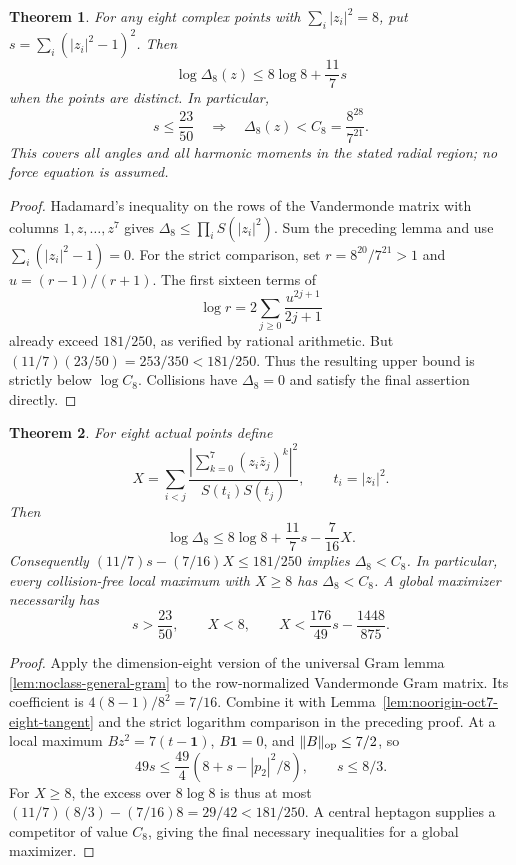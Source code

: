 \documentclass[11pt]{article}
\newtheorem{theorem}{Theorem}[section]
\theoremstyle{remark}
\numberwithin{equation}{section}
\begin{document}
\begin{theorem}\label{thm:noorigin-oct7-eight-lowvariance}
For any eight complex points with $\sum_i|z_i|^2=8$, put
$s=\sum_i(|z_i|^2-1)^2$. Then
\[
 \log\Delta_8(z)\le8\log8+\frac{11}{7}s
\]
when the points are distinct. In particular,
\[
 s\le\frac{23}{50}\quad\Longrightarrow\quad
 \Delta_8(z)<C_8=\frac{8^{28}}{7^{21}}.
\]
This covers all angles and all harmonic moments in the stated radial
region; no force equation is assumed.
\end{theorem}
\begin{proof}
Hadamard's inequality on the rows of the Vandermonde matrix with
columns $1,z,\ldots,z^7$ gives $\Delta_8\le\prod_iS(|z_i|^2)$.
Sum the preceding lemma and use $\sum_i(|z_i|^2-1)=0$.
For the strict comparison, set $r=8^{20}/7^{21}>1$ and
$u=(r-1)/(r+1)$. The first sixteen terms of
\[
 \log r=2\sum_{j\ge0}\frac{u^{2j+1}}{2j+1}
\]
already exceed $181/250$, as verified by rational arithmetic.
But $(11/7)(23/50)=253/350<181/250$.
Thus the resulting upper bound is strictly below $\log C_8$.
Collisions have $\Delta_8=0$ and satisfy the final assertion directly.
\end{proof}

\begin{theorem}\label{thm:noorigin-oct7-eight-correlation}
For eight actual points define
\[
 X=\sum_{i<j}\frac{|\sum_{k=0}^7(z_i\overline z_j)^k|^2}
 {S(t_i)S(t_j)},\qquad t_i=|z_i|^2.
\]
Then
\[
 \log\Delta_8\le8\log8+\frac{11}{7}s-\frac7{16}X.
\]
Consequently $(11/7)s-(7/16)X\le181/250$ implies
$\Delta_8<C_8$. In particular, every collision-free local maximum
with $X\ge8$ has $\Delta_8<C_8$. A global maximizer necessarily
has
\[
 s>\frac{23}{50},\qquad X<8,\qquad
 X<\frac{176}{49}s-\frac{1448}{875}.
\]
\end{theorem}
\begin{proof}
Apply the dimension-eight version of the universal Gram lemma
\ref{lem:noclass-general-gram} to the row-normalized Vandermonde
Gram matrix. Its coefficient is $4(8-1)/8^2=7/16$.
Combine it with Lemma~\ref{lem:noorigin-oct7-eight-tangent} and
the strict logarithm comparison in the preceding proof.
At a local maximum $Bz^2=7(t-\mathbf1)$, $B\mathbf1=0$, and
$\|B\|_{\rm op}\le7/2$, so
\[
 49s\le\frac{49}{4}(8+s-|p_2|^2/8),\qquad s\le8/3.
\]
For $X\ge8$, the excess over $8\log8$ is thus at most
$(11/7)(8/3)-(7/16)8=29/42<181/250$.
A central heptagon supplies a competitor of value $C_8$, giving
the final necessary inequalities for a global maximizer.
\end{proof}
\end{document}
